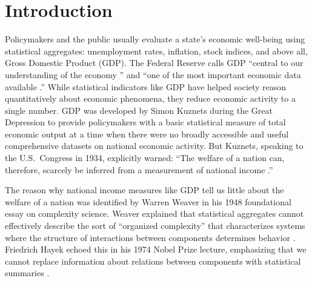 \documentclass[12pt,oneside]{book}
\begin{document}
\clearpage
{}
\begin{singlespace}
\listoffigures
\end{singlespace}

\mainmatter
\doublespacing

\chapter{Introduction}

Policymakers and the public usually evaluate a state's economic well-being using statistical aggregates: unemployment rates, inflation, stock indices, and above all, Gross Domestic Product (GDP). The Federal Reserve calls GDP ``central to our understanding of the economy \cite{wolla_gdp_nodate}'' and ``one of the most important economic data available \cite{fagan_what_nodate}.'' While statistical indicators like GDP have helped society reason quantitatively about economic phenomena, they reduce economic activity to a single number. GDP was developed by Simon Kuznets during the Great Depression to provide policymakers with a basic statistical measure of total economic output at a time when there were no broadly accessible and useful comprehensive datasets on national economic activity. But Kuznets, speaking to the U.S.\ Congress in 1934, explicitly warned: ``The welfare of a nation can, therefore, scarcely be inferred from a measurement of national income \cite{kuznets_national_1934}.''

The reason why national income measures like GDP tell us little about the welfare of a nation was identified by Warren Weaver in his 1948 foundational essay on complexity science. Weaver explained that statistical aggregates cannot effectively describe the sort of ``organized complexity'' that characterizes systems where the structure of interactions between components determines behavior \cite{weaver_science_1948}. Friedrich Hayek echoed this in his 1974 Nobel Prize lecture, emphasizing that we cannot replace information about relations between components with statistical summaries \cite{hayek_pretense_1974}. 
\end{document}
